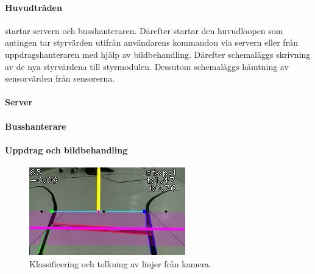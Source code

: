 \documentclass[tekniskrapport/tech.tex]{subfiles}
\begin{document}
\paragraph{Huvudtråden} startar servern och busshanteraren. Därefter startar
den huvudloopen som antingen tar styrvärden utifrån användarens kommandon via
servern eller från uppdragshanteraren med hjälp av bildbehandling. Därefter schemaläggs
skrivning av de nya styrvärdena till styrmodulen. Dessutom schemaläggs hämtning
av sensorvärden från sensorerna.

\paragraph{Server}

\paragraph{Busshanterare} 

\paragraph{Uppdrag och bildbehandling}

\begin{figure}
    \begin{center}
        \includegraphics[width=\linewidth]{tekniskrapport/figures/opencv.jpg}
    \end{center}
    \caption{Klassificering och tolkning av linjer från kamera.}
\end{figure}
\end{document}
